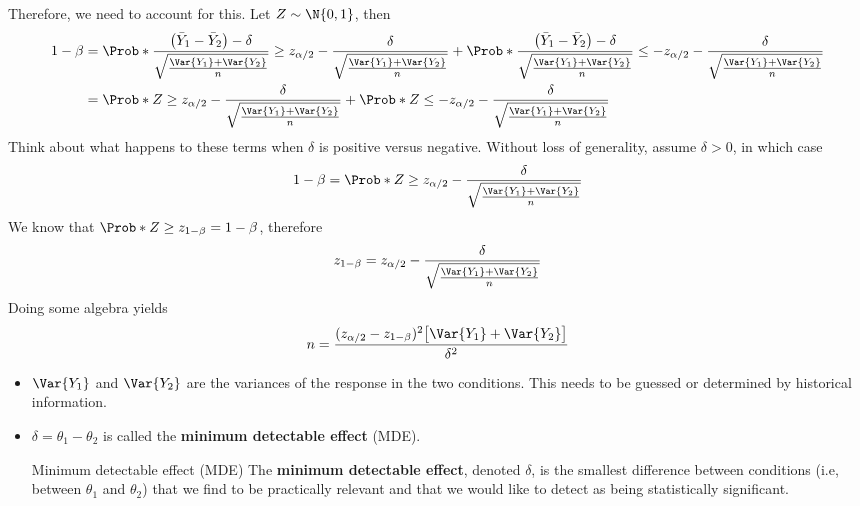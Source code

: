 Therefore, we need to account for this. Let $ Z \sim \N{0,1} $, then
\begin{align*}
    1-\beta
     & =\Prob*{\frac{\bigl(\bar{Y}_1-\bar{Y}_2\bigr)-\delta}{\sqrt{\frac{\Var{Y_1}+\Var{Y_2}}{n}}}\ge z_{\alpha/2}-\frac{\delta}{\sqrt{\frac{\Var{Y_1}+\Var{Y_2}}{n}}}}+\Prob*{\frac{\bigl(\bar{Y}_1-\bar{Y}_2\bigr)-\delta}{\sqrt{\frac{\Var{Y_1}+\Var{Y_2}}{n}}}\le -z_{\alpha/2}-\frac{\delta}{\sqrt{\frac{\Var{Y_1}+\Var{Y_2}}{n}}}} \\
     & =\Prob*{Z\ge z_{\alpha/2}-\frac{\delta}{\sqrt{\frac{\Var{Y_1}+\Var{Y_2}}{n}}}}+\Prob*{Z\le -z_{\alpha/2}-\frac{\delta}{\sqrt{\frac{\Var{Y_1}+\Var{Y_2}}{n}}}}
\end{align*}
Think about what happens to these terms when $ \delta $ is positive versus negative.
Without loss of generality, assume $ \delta>0 $, in which case
\[ 1-\beta=\Prob*{Z\ge z_{\alpha/2}-\frac{\delta}{\sqrt{\frac{\Var{Y_1}+\Var{Y_2}}{n}}}} \]
We know that $ \Prob*{Z\ge z_{1-\beta}}=1-\beta $, therefore
\[ z_{1-\beta}=z_{\alpha/2}-\frac{\delta}{\sqrt{\frac{\Var{Y_1}+\Var{Y_2}}{n}}} \]
Doing some algebra yields
\[ n=\frac{(z_{\alpha/2}-z_{1-\beta})^2\bigl[\Var{Y_1}+\Var{Y_2}\bigr]}{\delta^2}  \]
\begin{itemize}
    \item $ \Var{Y_1} $ and $ \Var{Y_2} $ are the variances of the response in the two conditions.
          This needs to be guessed or determined by historical information.
    \item $ \delta=\theta_1-\theta_2 $ is called the \textbf{minimum detectable effect} (MDE).
          \begin{Definition}{Minimum detectable effect (MDE)}{}
              The \textbf{minimum detectable effect}, denoted $ \delta $,
              is the smallest difference between conditions (i.e, between
              $ \theta_1 $ and $ \theta_2 $)
              that we find to be practically relevant and that we would like
              to detect as being statistically significant.
          \end{Definition}
\end{itemize}

